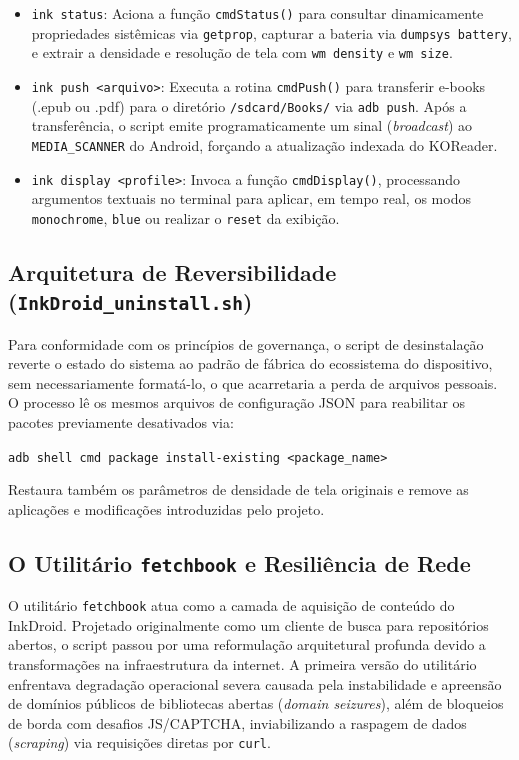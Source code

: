 \documentclass[
    12pt,
    openright,
    oneside,
    a4paper,
    english,
    brazilian
    ]{abntex2}
\begin{document}
\begin{itemize}
    \item \texttt{ink status}: Aciona a função \texttt{cmdStatus()} para consultar dinamicamente propriedades sistêmicas via \texttt{getprop}, capturar a bateria via \texttt{dumpsys battery}, e extrair a densidade e resolução de tela com \texttt{wm density} e \texttt{wm size}.
    \item \texttt{ink push <arquivo>}: Executa a rotina \texttt{cmdPush()} para transferir e-books (.epub ou .pdf) para o diretório \texttt{/sdcard/Books/} via \texttt{adb push}. Após a transferência, o script emite programaticamente um sinal (\textit{broadcast}) ao \texttt{MEDIA\_SCANNER} do Android, forçando a atualização indexada do KOReader.
    \item \texttt{ink display <profile>}: Invoca a função \texttt{cmdDisplay()}, processando argumentos textuais no terminal para aplicar, em tempo real, os modos \texttt{monochrome}, \texttt{blue} ou realizar o \texttt{reset} da exibição.
\end{itemize}

\subsection{Arquitetura de Reversibilidade (\texttt{InkDroid\_uninstall.sh})}

Para conformidade com os princípios de governança, o script de desinstalação reverte o estado do sistema ao padrão de fábrica do ecossistema do dispositivo, sem necessariamente formatá-lo, o que acarretaria a perda de arquivos pessoais. O processo lê os mesmos arquivos de configuração JSON para reabilitar os pacotes previamente desativados via:
\begin{center}
    \texttt{adb shell cmd package install-existing <package\_name>}
\end{center}
Restaura também os parâmetros de densidade de tela originais e remove as aplicações e modificações introduzidas pelo projeto.

\subsection{O Utilitário \texttt{fetchbook} e Resiliência de Rede}

O utilitário \texttt{fetchbook} atua como a camada de aquisição de conteúdo do InkDroid. Projetado originalmente como um cliente de busca para repositórios abertos, o script passou por uma reformulação arquitetural profunda devido a transformações na infraestrutura da internet. A primeira versão do utilitário enfrentava degradação operacional severa causada pela instabilidade e apreensão de domínios públicos de bibliotecas abertas (\textit{domain seizures}), além de bloqueios de borda com desafios JS/CAPTCHA, inviabilizando a raspagem de dados (\textit{scraping}) via requisições diretas por \texttt{curl}.
\end{document}
